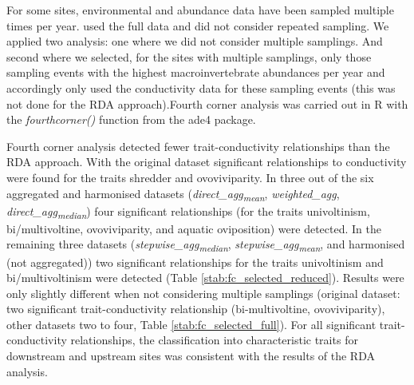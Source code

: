 \documentclass[12pt]{article}
\begin{document}
For some sites, environmental and abundance data have been sampled multiple times per year. \citet{szocs_effects_2014} used the full data and did not consider repeated sampling. We applied two analysis: one where we did not consider multiple samplings. And second where we selected, for the sites with multiple samplings, only those sampling events with the highest macroinvertebrate abundances per year and accordingly only used the conductivity data for these sampling events (this was not done for the RDA approach).Fourth corner analysis was carried out in R with the \textit{fourthcorner()} function from the ade4 package.

Fourth corner analysis detected fewer trait-conductivity relationships than the RDA approach. With the original dataset significant relationships to conductivity were found for the traits shredder and ovoviviparity. In three out of the six aggregated and harmonised datasets (\textit{direct\_agg\textsubscript{mean}}, \textit{weighted\_agg}, \textit{direct\_agg\textsubscript{median}}) four significant relationships (for the traits univoltinism, bi/multivoltine, ovoviviparity, and aquatic oviposition) were detected. In the remaining three datasets (\textit{stepwise\_agg\textsubscript{median}}, \textit{stepwise\_agg\textsubscript{mean}}, and harmonised (not aggregated)) two significant relationships for the traits univoltinism and bi/multivoltinism were detected (Table \ref{stab:fc_selected_reduced}). Results were only slightly different when not considering multiple samplings (original dataset: two significant trait-conductivity relationship (bi-multivoltine, ovoviviparity), other datasets two to four, Table \ref{stab:fc_selected_full}). For all significant trait-conductivity relationships, the classification into characteristic traits for downstream and upstream sites was consistent with the results of the RDA analysis.
\end{document}

